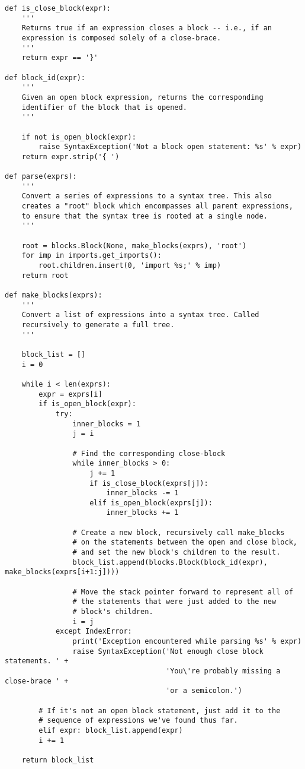 \begin{lstlisting}
def is_close_block(expr):
    '''
    Returns true if an expression closes a block -- i.e., if an
    expression is composed solely of a close-brace.
    '''
    return expr == '}'

def block_id(expr):
    '''
    Given an open block expression, returns the corresponding
    identifier of the block that is opened.
    '''

    if not is_open_block(expr):
        raise SyntaxException('Not a block open statement: %s' % expr)
    return expr.strip('{ ')

def parse(exprs):
    '''
    Convert a series of expressions to a syntax tree. This also
    creates a "root" block which encompasses all parent expressions,
    to ensure that the syntax tree is rooted at a single node.
    '''

    root = blocks.Block(None, make_blocks(exprs), 'root')
    for imp in imports.get_imports():
        root.children.insert(0, 'import %s;' % imp)
    return root

def make_blocks(exprs):
    '''
    Convert a list of expressions into a syntax tree. Called
    recursively to generate a full tree.
    '''

    block_list = []
    i = 0

    while i < len(exprs):
        expr = exprs[i]
        if is_open_block(expr):
            try:
                inner_blocks = 1
                j = i

                # Find the corresponding close-block
                while inner_blocks > 0:
                    j += 1
                    if is_close_block(exprs[j]):
                        inner_blocks -= 1
                    elif is_open_block(exprs[j]):
                        inner_blocks += 1

                # Create a new block, recursively call make_blocks
                # on the statements between the open and close block,
                # and set the new block's children to the result.
                block_list.append(blocks.Block(block_id(expr), make_blocks(exprs[i+1:j])))

                # Move the stack pointer forward to represent all of
                # the statements that were just added to the new
                # block's children.
                i = j
            except IndexError:
                print('Exception encountered while parsing %s' % expr)
                raise SyntaxException('Not enough close block statements. ' +
                                      'You\'re probably missing a close-brace ' +
                                      'or a semicolon.')

        # If it's not an open block statement, just add it to the
        # sequence of expressions we've found thus far.
        elif expr: block_list.append(expr)
        i += 1

    return block_list
\end{lstlisting}

